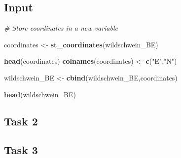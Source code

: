 \documentclass[]{book}
\newenvironment{Shaded}{\begin{snugshade}}{\end{snugshade}}
\newcommand{\KeywordTok}[1]{\textcolor[rgb]{0.13,0.29,0.53}{\textbf{#1}}}
\newcommand{\DataTypeTok}[1]{\textcolor[rgb]{0.13,0.29,0.53}{#1}}
\newcommand{\DecValTok}[1]{\textcolor[rgb]{0.00,0.00,0.81}{#1}}
\newcommand{\StringTok}[1]{\textcolor[rgb]{0.31,0.60,0.02}{#1}}
\newcommand{\CommentTok}[1]{\textcolor[rgb]{0.56,0.35,0.01}{\textit{#1}}}
\newcommand{\OperatorTok}[1]{\textcolor[rgb]{0.81,0.36,0.00}{\textbf{#1}}}
\newcommand{\NormalTok}[1]{#1}
\begin{document}
\subsection{Input}\label{input}

\begin{Shaded}
\begin{Highlighting}[]
\CommentTok{# Store coordinates in a new variable}

\NormalTok{coordinates <-}\StringTok{ }\KeywordTok{st_coordinates}\NormalTok{(wildschwein_BE)}

\KeywordTok{head}\NormalTok{(coordinates)}
\KeywordTok{colnames}\NormalTok{(coordinates) <-}\StringTok{ }\KeywordTok{c}\NormalTok{(}\StringTok{"E"}\NormalTok{,}\StringTok{"N"}\NormalTok{)}

\NormalTok{wildschwein_BE <-}\StringTok{ }\KeywordTok{cbind}\NormalTok{(wildschwein_BE,coordinates)}

\KeywordTok{head}\NormalTok{(wildschwein_BE)}
\end{Highlighting}
\end{Shaded}

\subsection{Task 2}\label{task-2}

\begin{Shaded}
\end{Shaded}

\subsection{Task 3}\label{task-3}
\end{document}

